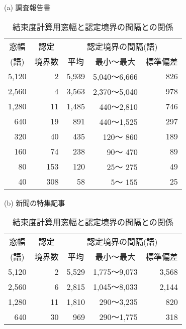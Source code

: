 \begin{table}[htbp]\small
  \leavevmode
  \caption{結束度計算用窓幅と認定境界の間隔との関係}
  \label{tab:窓幅と境界間隔}
  \begin{center}
    (a) 調査報告書\\
    \medskip{}
    \begin{tabular}{|r|r|r|r|r|}
      \hline
      \multicolumn{1}{|c|}{窓幅}
      & \multicolumn{1}{c|}{認定}
      & \multicolumn{3}{c|}{認定境界の間隔(語)}\\
      \cline{3-5}
      \multicolumn{1}{|c|}{(語)}
      & \multicolumn{1}{c|}{境界数}      
      & \multicolumn{1}{c|}{平均}
      & \multicolumn{1}{c|}{最小〜最大}
      & \multicolumn{1}{c|}{標準偏差}\\
      \hline
      5,120 &   2 & 5,939 & 5,040〜6,666 & 826 \\
      2,560 &   4 & 3,563 & 2,370〜5,040 & 978 \\
      1,280 &  11 & 1,485 &   440〜2,810 & 746 \\
        640 &  19 &   891 &   440〜1,525 & 297 \\
        320 &  40 &   435 &   120〜  860 & 189 \\
        160 &  74 &   238 &    90〜  470 &  89 \\
         80 & 153 &   120 &    25〜  275 &  49 \\
         40 & 308 &    58 &     5〜  155 &  25 \\
      \hline
    \end{tabular}
  \end{center}
  \begin{center}
    (b) 新聞の特集記事\\
    \medskip{}
    \begin{tabular}{|r|r|r|r|r|}
      \hline
      \multicolumn{1}{|c|}{窓幅}
      & \multicolumn{1}{c|}{認定}
      & \multicolumn{3}{c|}{認定境界の間隔(語)}\\
      \cline{3-5}
      \multicolumn{1}{|c|}{(語)}
      & \multicolumn{1}{c|}{境界数}
      & \multicolumn{1}{c|}{平均}
      & \multicolumn{1}{c|}{最小〜最大}
      & \multicolumn{1}{c|}{標準偏差}\\
      \hline
      5,120 &    2 & 5,529 & 1,775〜9,073 & 3,568 \\
      2,560 &    6 & 2,815 & 1,045〜8,033 & 2,144 \\
      1,280 &   11 & 1,810 &   290〜3,235 &   820 \\
        640 &   30 &   969 &   290〜1,775 &   318 \\

\end{tabular}
\end{center}
\end{table}
